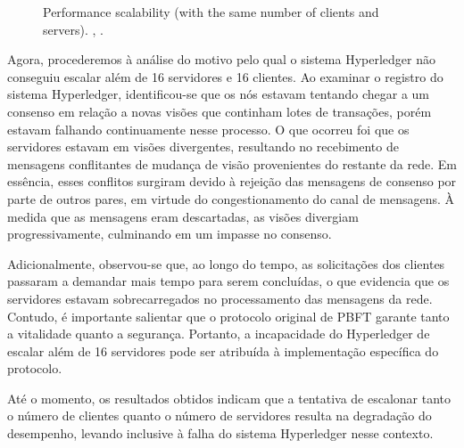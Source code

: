             \begin{figure}[H]
                \centering
                \caption{Performance scalability (with the same number of clients and servers). \cite{blockbench}, .}
                \label{perfomance-scability}
            \end{figure}

Agora, procederemos à análise do motivo pelo qual o sistema Hyperledger não conseguiu escalar além de 16 servidores e 16 clientes. Ao examinar o registro do sistema Hyperledger, identificou-se que os nós estavam tentando chegar a um consenso em relação a novas visões que continham lotes de transações, porém estavam falhando continuamente nesse processo. O que ocorreu foi que os servidores estavam em visões divergentes, resultando no recebimento de mensagens conflitantes de mudança de visão provenientes do restante da rede. Em essência, esses conflitos surgiram devido à rejeição das mensagens de consenso por parte de outros pares, em virtude do congestionamento do canal de mensagens. À medida que as mensagens eram descartadas, as visões divergiam progressivamente, culminando em um impasse no consenso.

Adicionalmente, observou-se que, ao longo do tempo, as solicitações dos clientes passaram a demandar mais tempo para serem concluídas, o que evidencia que os servidores estavam sobrecarregados no processamento das mensagens da rede. Contudo, é importante salientar que o protocolo original de PBFT garante tanto a vitalidade quanto a segurança. Portanto, a incapacidade do Hyperledger de escalar além de 16 servidores pode ser atribuída à implementação específica do protocolo.

Até o momento, os resultados obtidos indicam que a tentativa de escalonar tanto o número de clientes quanto o número de servidores resulta na degradação do desempenho, levando inclusive à falha do sistema Hyperledger nesse contexto.

